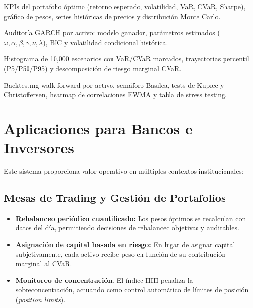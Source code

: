 \documentclass[11pt,a4paper]{article}
\begin{document}
\begin{description}[leftmargin=2cm]
    \item[\textbf{Overview:}] KPIs del portafolio óptimo (retorno esperado, volatilidad, VaR,
    CVaR, Sharpe), gráfico de pesos, series históricas de precios y distribución Monte Carlo.
    \item[\textbf{Risk Analytics:}] Auditoría GARCH por activo: modelo ganador, parámetros estimados
    ($\omega, \alpha, \beta, \gamma, \nu, \lambda$), BIC y volatilidad condicional histórica.
    \item[\textbf{Monte Carlo:}] Histograma de 10{,}000 escenarios con VaR/CVaR marcados,
    trayectorias percentil (P5/P50/P95) y descomposición de riesgo marginal CVaR.
    \item[\textbf{Validation \& Stress:}] Backtesting walk-forward por activo, semáforo Basilea,
    tests de Kupiec y Christoffersen, heatmap de correlaciones EWMA y tabla de stress testing.
\end{description}

\section{Aplicaciones para Bancos e Inversores}

Este sistema proporciona valor operativo en múltiples contextos institucionales:

\subsection{Mesas de Trading y Gestión de Portafolios}

\begin{itemize}[leftmargin=*]
    \item \textbf{Rebalanceo periódico cuantificado:} Los pesos óptimos se recalculan con
    datos del día, permitiendo decisiones de rebalanceo objetivas y auditables.
    \item \textbf{Asignación de capital basada en riesgo:} En lugar de asignar capital
    subjetivamente, cada activo recibe peso en función de su contribución marginal al CVaR.
    \item \textbf{Monitoreo de concentración:} El índice HHI penaliza la sobreconcentración,
    actuando como control automático de límites de posición (\textit{position limits}).
\end{itemize}
\end{document}
